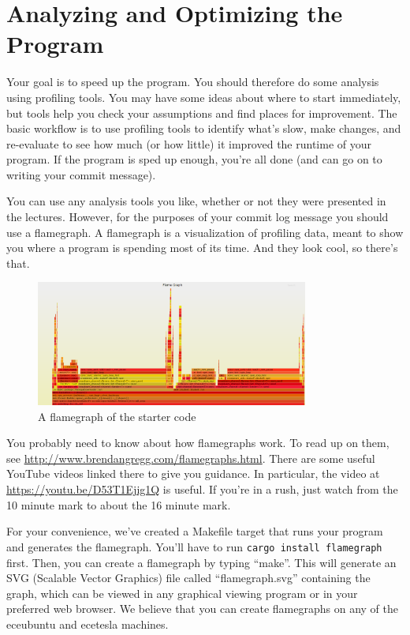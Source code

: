 \section*{Analyzing and Optimizing the Program }
Your goal is to speed up the program. You should therefore do some analysis using profiling tools. You may have some ideas about where to start immediately, but tools help you check your assumptions and find places for improvement. The basic workflow is to use profiling tools to identify what's slow, make changes, and re-evaluate to see how much (or how little) it improved the runtime of your program. If the program is sped up enough, you're all done (and can go on to writing your commit message). 


You can use any analysis tools you like, whether or not they were presented in the lectures. However, for the purposes of your commit log message you should use a flamegraph. A flamegraph is a visualization of profiling data, meant to show you where a program is spending most of its time. And they look cool, so there's that. 

\begin{figure}[h]
	\begin{center}
		\caption{A flamegraph of the starter code}
		\includegraphics[width=0.8\textwidth]{./flamegraph.png}
	\end{center}
\end{figure}


You probably need to know about how flamegraphs work. To read up on them, see \url{http://www.brendangregg.com/flamegraphs.html}. There are some useful YouTube videos linked there to give you guidance. In particular, the video at \url{https://youtu.be/D53T1Ejig1Q} is useful. If you're in a rush, just watch from the 10 minute mark to about the 16 minute mark.

For your convenience, we've created a Makefile target that runs your program and generates the flamegraph. You'll have to run \texttt{cargo install flamegraph} first. Then, you can create a flamegraph by typing ``make''. This will generate an SVG (Scalable Vector Graphics) file called ``flamegraph.svg''  containing the graph, which can be viewed in any graphical viewing program or in your preferred web browser. We believe that you can create flamegraphs on any of the eceubuntu and ecetesla machines.

